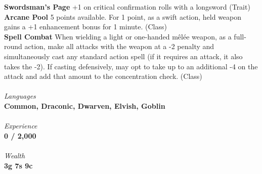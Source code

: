 \documentclass[letterpaper]{article}
\newcommand{\e}[1]{\emph{#1}}
\newcommand{\B}[1]{\textbf{#1}}
\begin{document}
\B{Swordsman's Page} +1 on critical confirmation rolls with a longsword (Trait) \\
\B{Arcane Pool} 5 points available. For 1 point, as a swift action, held weapon gains a +1 enhancement bonus for 1 minute. (Class) \\%
\B{Spell Combat} When wielding a light or one-handed m\^{e}l\'{e}e weapon, as a full-round action, make all attacks with the weapon at a -2 penalty and simultaneously cast any standard action spell (if it requires an attack, it also takes the -2). If casting defensively, may opt to take up to an additional -4 on the attack and add that amount to the concentration check. (Class)\\ %
\\
\e{Languages} \\
\B{Common, Draconic, Dwarven, Elvish, Goblin} \\
\\
{\e{Experience}} \\
\B{0 / 2,000} \\
\\
{\e{Wealth}} \\
\B{3g 7s 9c}
\end{document}
